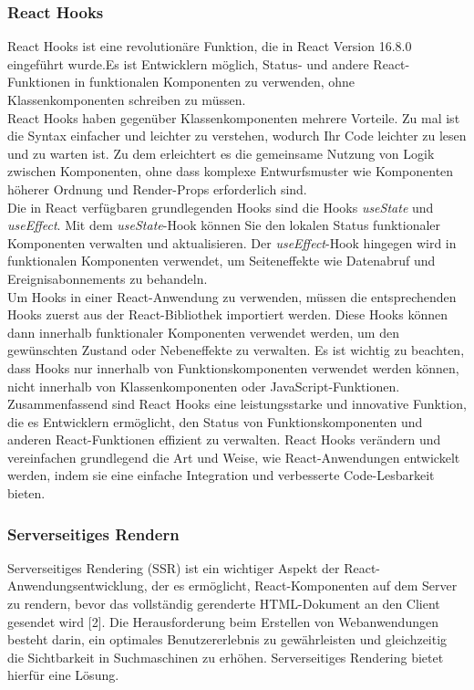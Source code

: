 \subsubsection{React Hooks}
React Hooks ist eine revolutionäre Funktion, die in React Version 16.8.0 eingeführt wurde.Es ist  Entwicklern möglich, Status- und andere React-Funktionen in funktionalen Komponenten zu verwenden, ohne Klassenkomponenten schreiben zu müssen.\\
React Hooks haben gegenüber Klassenkomponenten mehrere Vorteile. Zu mal ist die Syntax einfacher und leichter  zu verstehen, wodurch Ihr Code leichter zu lesen und zu warten ist. Zu dem erleichtert es die gemeinsame Nutzung von Logik zwischen Komponenten, ohne dass komplexe Entwurfsmuster wie Komponenten höherer Ordnung und Render-Props erforderlich sind.\\
Die in React verfügbaren grundlegenden Hooks sind die Hooks \emph{useState} und \emph{useEffect}. Mit dem \emph{useState}-Hook können Sie den lokalen Status funktionaler Komponenten verwalten und  aktualisieren. Der \emph{useEffect}-Hook hingegen wird  in funktionalen Komponenten verwendet, um Seiteneffekte wie Datenabruf und Ereignisabonnements zu behandeln.\\  
Um Hooks in einer React-Anwendung zu verwenden, müssen   die entsprechenden Hooks zuerst aus der React-Bibliothek importiert werden. Diese Hooks können dann innerhalb funktionaler Komponenten verwendet werden, um den gewünschten Zustand oder Nebeneffekte zu verwalten. Es ist wichtig zu beachten, dass Hooks nur innerhalb von Funktionskomponenten verwendet werden können, nicht innerhalb von Klassenkomponenten oder JavaScript-Funktionen. \cite{react-hooks}\\
Zusammenfassend sind React Hooks eine leistungsstarke und innovative Funktion, die es Entwicklern ermöglicht, den Status von Funktionskomponenten und anderen React-Funktionen effizient zu verwalten.  React Hooks verändern und vereinfachen grundlegend die Art und Weise, wie React-Anwendungen entwickelt werden, indem sie eine einfache Integration und verbesserte Code-Lesbarkeit bieten.

\subsubsection{Serverseitiges Rendern}
Serverseitiges Rendering (SSR) ist ein wichtiger Aspekt der React-Anwendungsentwicklung, der es ermöglicht, React-Komponenten auf dem Server zu rendern, bevor das vollständig gerenderte HTML-Dokument an den Client gesendet wird [2].
Die Herausforderung beim Erstellen von Webanwendungen besteht darin, ein optimales Benutzererlebnis zu gewährleisten und gleichzeitig die Sichtbarkeit in Suchmaschinen zu erhöhen. Serverseitiges Rendering bietet hierfür eine Lösung.\\

